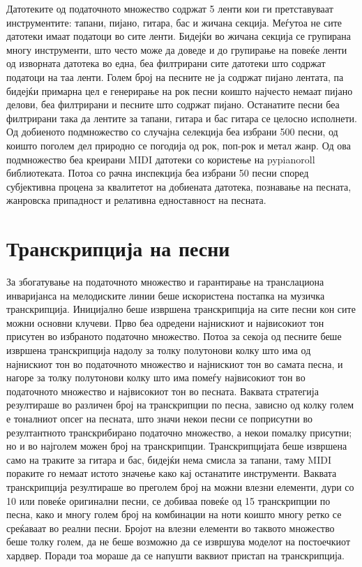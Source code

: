 Датотеките од податочното множество содржат 5 ленти кои ги претставуваат инструментите: тапани, пијано, гитара, бас и жичана секција. Меѓутоа не сите датотеки имаат податоци во сите ленти. Бидејќи во жичана секција се групирана многу инструменти, што често може да доведе и до групирање на повеќе ленти од изворната датотека во една, беа филтрирани сите датотеки што содржат податоци на таа ленти. Голем број на песните не ја содржат пијано лентата, па бидејќи примарна цел е генерирање на рок песни коишто најчесто немаат пијано делови, беа филтрирани и песните што содржат пијано. Останатите песни беа филтрирани така да лентите за тапани, гитара и бас гитара се целосно исполнети. Од добиеното подмножество со случајна селекција беа избрани 500 песни, од коишто поголем дел природно се погодија од рок, поп-рок и метал жанр. Од ова подмножество беа креирани MIDI датотеки со користење на pypianoroll библиотеката. Потоа со рачна инспекција беа избрани 50 песни според субјективна процена за квалитетот на добиената датотека, познавање на песната, жанровска припадност и релативна едноставност на песната.

\section{Транскрипција на песни}

За збогатување на податочното множество и гарантирање на транслациона инваријанса на мелодиските линии беше искористена постапка на музичка транскрипција. Иницијално беше извршена транскрипција на сите песни кон сите можни основни клучеви. Прво беа одредени најнискиот и највисокиот тон присутен во избраното податочно множество. Потоа за секоја од песните беше извршена транскрипција надолу за толку полутонови колку што има од најнискиот тон во податочното множество и најнискиот тон во самата песна, и нагоре за толку полутонови колку што има помеѓу највисокиот тон во податочното множество и највисокиот тон во песната. Ваквата стратегија резултираше во различен број на транскрипции по песна, зависно од колку голем е тоналниот опсег на песната, што значи некои песни се поприсутни во резултантното транскрибирано податочно множество, а некои помалку присутни; но и во најголем можен број на транскрипции. Транскрипцијата беше извршена само на траките за гитара и бас, бидејќи нема смисла за тапани, таму MIDI пораките го немаат истото значење како кај останатите инструменти. Ваквата транскрипција резултираше во преголем број на можни влезни елементи, дури со 10 или повеќе оригинални песни, се добиваа повеќе од 15 транскрипции по песна, како и многу голем број на комбинации на ноти коишто многу ретко се среќаваат во реални песни. Бројот на влезни елементи во таквото множество беше толку голем, да не беше возможно да се извршува моделот на постоечкиот хардвер. Поради тоа мораше да се напушти ваквиот пристап на транскрипција. 

